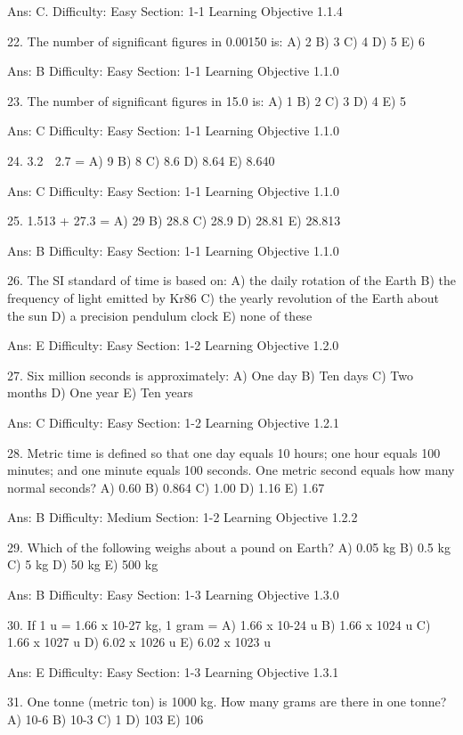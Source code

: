 Ans: C.
Difficulty: Easy
Section: 1-1
Learning Objective 1.1.4

22.  The number of significant figures in 0.00150 is: 
A)  2 
B)  3 
C)  4 
D)  5 
E)  6 

Ans:  B
Difficulty:  Easy
Section:  1-1
Learning Objective 1.1.0


23.  The number of significant figures in 15.0 is: 
A)  1 
B)  2 
C)  3 
D)  4 
E)  5 

Ans:  C
Difficulty:  Easy
Section:  1-1
Learning Objective 1.1.0


24.  3.2  2.7 = 
A)  9 
B)  8 
C)  8.6 
D)  8.64 
E)  8.640 

Ans:  C
Difficulty:  Easy
Section:  1-1
Learning Objective 1.1.0



25.  1.513 + 27.3 =
A)  29
B)  28.8
C)  28.9
D)  28.81
E)  28.813

Ans:  B
Difficulty:  Easy
Section:  1-1
Learning Objective 1.1.0


26.  The SI standard of time is based on: 
A)  the daily rotation of the Earth 
B)  the frequency of light emitted by Kr86 
C)  the yearly revolution of the Earth about the sun 
D)  a precision pendulum clock 
E)  none of these 

Ans:  E
Difficulty:  Easy
Section:  1-2
Learning Objective 1.2.0


27. Six million seconds is approximately:
A)  One day
B)  Ten days
C)  Two months
D)  One year
E)  Ten years

Ans: C
Difficulty:  Easy
Section:  1-2
Learning Objective 1.2.1

28. Metric time is defined so that one day equals 10 hours; one hour equals 100 minutes; and one minute equals 100 seconds. One metric second equals how many normal seconds?
A) 0.60
B) 0.864
C) 1.00
D) 1.16
E) 1.67

Ans: B
Difficulty: Medium
Section: 1-2
Learning Objective 1.2.2

29. Which of the following weighs about a pound on Earth? 
A)  0.05 kg 
B)  0.5 kg 
C)  5 kg 
D)  50 kg 
E)  500 kg 

Ans:  B
Difficulty:  Easy
Section:  1-3
Learning Objective 1.3.0


30. If 1 u = 1.66 x 10-27 kg, 1 gram =
A)  1.66 x 10-24 u
B)  1.66 x 1024 u
C)  1.66 x 1027 u
D)  6.02 x 1026 u
E)  6.02 x 1023 u

Ans: E
Difficulty: Easy
Section: 1-3
Learning Objective 1.3.1

31. One tonne (metric ton) is 1000 kg. How many grams are there in one tonne?
A) 10-6
B) 10-3
C) 1
D) 103
E) 106

